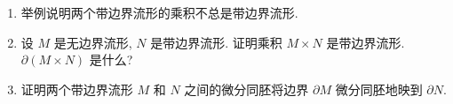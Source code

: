 \begin{RiemannExercise}\label{ex:manifolds-with-boundary}
\begin{enumerate}[label=(\arabic*),ref=\arabic*,leftmargin=*]
\item\label{ex:product-with-corners} 举例说明两个带边界流形的乘积不总是带边界流形.
\item\label{ex:product-with-boundaryless-manifold} 设 $M$ 是无边界流形, $N$ 是带边界流形. 证明乘积 $M\times N$ 是带边界流形. $\partial(M\times N)$ 是什么?
\item\label{ex:diffeomorphism-preserves-boundary} 证明两个带边界流形 $M$ 和 $N$ 之间的微分同胚将边界 $\partial M$ 微分同胚地映到 $\partial N$.
\end{enumerate}
\end{RiemannExercise}
